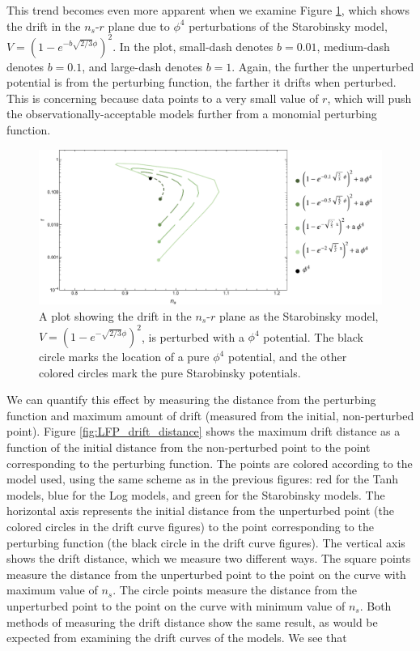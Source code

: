 \documentclass[a4paper,11pt]{article}
\def\nsr{$n_s$-$r$ }
\begin{document}
This trend becomes even more apparent when we examine Figure \ref{fig:LFP_Rsq_drift}, which shows the drift in the \nsr plane due to $\phi^4$ perturbations of the Starobinsky model, $V=(1-e^{-b\sqrt{2/3}\phi})^2$. In the plot, small-dash denotes $b=0.01$, medium-dash denotes $b=0.1$, and large-dash denotes $b=1$. Again, the further the unperturbed potential is from the perturbing function, the farther it drifts when perturbed. This is concerning because \citet{Planck2015} data points to a very small value of $r$, which will push the observationally-acceptable models further from a monomial perturbing function. 

\begin{figure}[h!]
	\centering
	\includegraphics[width=\textwidth]{figures/LFP_lines_Rsq_final.pdf}
	\caption[Drift in \nsr plane for Starobinsky model with perturbations.]{A plot showing the drift in the \nsr plane as the Starobinsky model, $V=(1-e^{-\sqrt{2/3}\phi})^2$, is perturbed with a $\phi^4$ potential. The black circle marks the location of a pure $\phi^4$ potential, and the other colored circles mark the pure Starobinsky potentials.}
	\label{fig:LFP_Rsq_drift}
\end{figure}

We can quantify this effect by measuring the distance from the perturbing function and maximum amount of drift (measured from the initial, non-perturbed point). Figure \ref{fig:LFP_drift_distance} shows the maximum drift distance as a function of the initial distance from the non-perturbed point to the point corresponding to the perturbing function. The points are colored according to the model used, using the same scheme as in the previous figures: red for the Tanh models, blue for the Log models, and green for the Starobinsky models. The horizontal axis represents the initial distance from the unperturbed point (the colored circles in the drift curve figures) to the point corresponding to the perturbing function (the black circle in the drift curve figures). The vertical axis shows the drift distance, which we measure two different ways. The square points measure the distance from the unperturbed point to the point on the curve with maximum value of $n_s$. The circle points measure the distance from the unperturbed point to the point on the curve with minimum value of $n_s$. Both methods of measuring the drift distance show the same result, as would be expected from examining the drift curves of the models. We see that 
\end{document}
